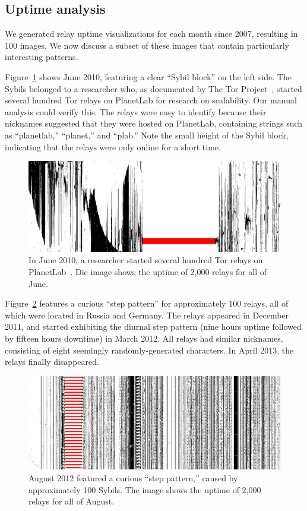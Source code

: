 \subsection{Uptime analysis}
\label{sec:uptime}
We generated relay uptime visualizations for each month since 2007, resulting in
100 images.  We now discuss a subset of these images that contain particularly
interesting patterns.

Figure~\ref{fig:2010-06-planetlab} shows June 2010, featuring a clear ``Sybil
block'' on the left side.  The Sybils belonged to a researcher who, as
documented by The Tor Project~\cite{progressreport}, started several hundred Tor
relays on PlanetLab for research on scalability.  Our manual analysis could
verify this.  The relays were easy to identify because their nicknames suggested
that they were hosted on PlanetLab, containing strings such as ``planetlab,''
``planet,'' and ``plab.''  Note the small height of the Sybil block, indicating
that the relays were only online for a short time.

\begin{figure}[t]
	\centering
	\includegraphics[width=\linewidth]{diagrams/2010-06.jpg}
	\caption{In June 2010, a researcher started several hundred Tor relays on
		PlanetLab~\cite{progressreport}.  Die image shows the uptime of 2,000
		relays for all of June.}
	\label{fig:2010-06-planetlab}
\end{figure}

Figure~\ref{fig:2012-08-steppattern} features a curious ``step pattern'' for
approximately 100 relays, all of which were located in Russia and Germany.  The
relays appeared in December 2011, and started exhibiting the diurnal step
pattern (nine hours uptime followed by fifteen hours downtime) in March 2012.
All relays had similar nicknames, consisting of eight seemingly
randomly-generated characters.  In April 2013, the relays finally disappeared.

\begin{figure}[t]
	\centering
	\includegraphics[width=\linewidth]{diagrams/2012-08.jpg}
	\caption{August 2012 featured a curious ``step pattern,'' caused by
	approximately 100 Sybils.  The image shows the uptime of 2,000 relays for
	all of August.}
	\label{fig:2012-08-steppattern}
\end{figure}

